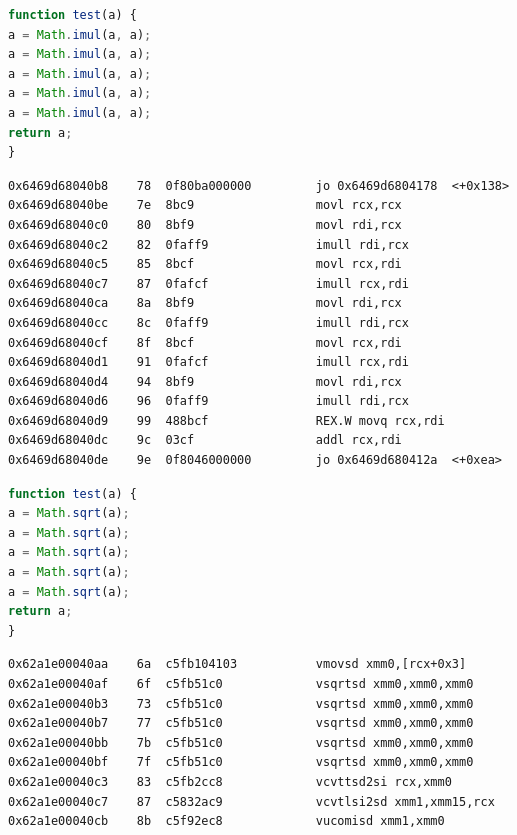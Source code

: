 \documentclass[11pt,
  titlepage=false,
  parskip=half,      %
]{scrreprt}
\begin{document}
\begin{lstlisting}[float,caption={A test function for the \texttt{imul} instruction},label={lst:testimul},language=JavaScript]
function test(a) {
a = Math.imul(a, a);
a = Math.imul(a, a);
a = Math.imul(a, a);
a = Math.imul(a, a);
a = Math.imul(a, a);
return a;
}
\end{lstlisting}

\begin{lstlisting}[float,caption={The compiled result of the \texttt{imul} test function},label={lst:compileimul}]
0x6469d68040b8    78  0f80ba000000         jo 0x6469d6804178  <+0x138>
0x6469d68040be    7e  8bc9                 movl rcx,rcx
0x6469d68040c0    80  8bf9                 movl rdi,rcx
0x6469d68040c2    82  0faff9               imull rdi,rcx
0x6469d68040c5    85  8bcf                 movl rcx,rdi
0x6469d68040c7    87  0fafcf               imull rcx,rdi
0x6469d68040ca    8a  8bf9                 movl rdi,rcx
0x6469d68040cc    8c  0faff9               imull rdi,rcx
0x6469d68040cf    8f  8bcf                 movl rcx,rdi
0x6469d68040d1    91  0fafcf               imull rcx,rdi
0x6469d68040d4    94  8bf9                 movl rdi,rcx
0x6469d68040d6    96  0faff9               imull rdi,rcx
0x6469d68040d9    99  488bcf               REX.W movq rcx,rdi
0x6469d68040dc    9c  03cf                 addl rcx,rdi
0x6469d68040de    9e  0f8046000000         jo 0x6469d680412a  <+0xea>
\end{lstlisting}

\begin{lstlisting}[float,caption={A test function for the \texttt{sqrt} instruction},label={lst:testsqrt},language=JavaScript]
function test(a) {
a = Math.sqrt(a);
a = Math.sqrt(a);
a = Math.sqrt(a);
a = Math.sqrt(a);
a = Math.sqrt(a);
return a;
}
\end{lstlisting}

\begin{lstlisting}[float,caption={The compiled result of the \texttt{sqrt} test function},label={lst:compilesqrt}]
0x62a1e00040aa    6a  c5fb104103           vmovsd xmm0,[rcx+0x3]
0x62a1e00040af    6f  c5fb51c0             vsqrtsd xmm0,xmm0,xmm0
0x62a1e00040b3    73  c5fb51c0             vsqrtsd xmm0,xmm0,xmm0
0x62a1e00040b7    77  c5fb51c0             vsqrtsd xmm0,xmm0,xmm0
0x62a1e00040bb    7b  c5fb51c0             vsqrtsd xmm0,xmm0,xmm0
0x62a1e00040bf    7f  c5fb51c0             vsqrtsd xmm0,xmm0,xmm0
0x62a1e00040c3    83  c5fb2cc8             vcvttsd2si rcx,xmm0
0x62a1e00040c7    87  c5832ac9             vcvtlsi2sd xmm1,xmm15,rcx
0x62a1e00040cb    8b  c5f92ec8             vucomisd xmm1,xmm0
\end{lstlisting}
\end{document}
